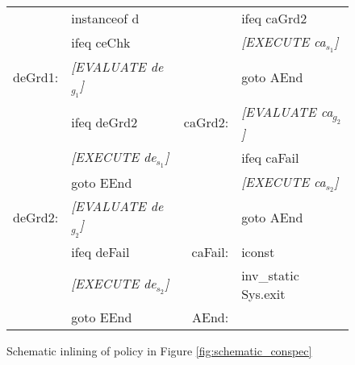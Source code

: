\documentclass[10pt,twocolumn]{article}
\begin{document}
\begin{figure}[!ht]
{\begin{tabular}{@{}r @{~} l @{$\>$}|@{$\>\>$} r @{~} l@{}}
              & instanceof d                             &               & ifeq caGrd2                               \\
              & ifeq ceChk                               &               & {\slshape [EXECUTE ca$_{s_1}$]}           \\
deGrd1:       & {\slshape [EVALUATE de$_{g_1}$]}         &               & goto AEnd                                 \\
              & ifeq deGrd2                              & caGrd2:       & {\slshape [EVALUATE ca$_{g_2}$]}          \\
              & {\slshape [EXECUTE de$_{s_1}$]}          &               & ifeq caFail                               \\
              & goto EEnd                                &               & {\slshape [EXECUTE ca$_{s_2}$]}           \\
deGrd2:       & {\slshape [EVALUATE de$_{g_2}$]}         &               & goto AEnd                                 \\
              & ifeq deFail                              & caFail:       & iconst\textunderscore 1                   \\
              & {\slshape [EXECUTE de$_{s_2}$]}          &               & inv\_static Sys.exit                      \\
              & goto EEnd                                & AEnd:         &                                           \\
\end{tabular}}
\caption{\label{fig:inlining_schema} Schematic inlining of policy in Figure \ref{fig:schematic_conspec}}
\end{figure}

\clearpage
\end{document}
